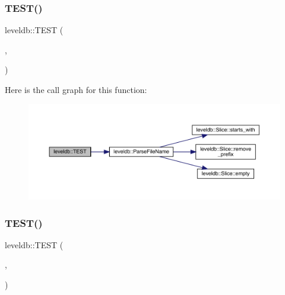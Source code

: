 \subsubsection{\texorpdfstring{TEST()}{TEST()}\hspace{0.1cm}{\footnotesize\ttfamily [1/102]}}
{\footnotesize\ttfamily leveldb\+::\+T\+E\+ST (\begin{DoxyParamCaption}\item[{\mbox{\hyperlink{classleveldb_1_1_file_name_test}{File\+Name\+Test}}}]{,  }\item[{Parse}]{ }\end{DoxyParamCaption})}

Here is the call graph for this function\+:
\nopagebreak
\begin{figure}[H]
\begin{center}
\leavevmode
\includegraphics[width=350pt]{namespaceleveldb_a28c411f7a30e2e869123a26f6e69e733_cgraph}
\end{center}
\end{figure}
\mbox{\label{namespaceleveldb_aa3106d7d6e907fc13c8c7ceed76740ad}} 
\subsubsection{\texorpdfstring{TEST()}{TEST()}\hspace{0.1cm}{\footnotesize\ttfamily [2/102]}}
{\footnotesize\ttfamily leveldb\+::\+T\+E\+ST (\begin{DoxyParamCaption}\item[{\mbox{\hyperlink{classleveldb_1_1_version_edit_test}{Version\+Edit\+Test}}}]{,  }\item[{Encode\+Decode}]{ }\end{DoxyParamCaption})}

